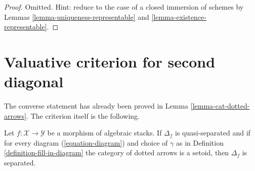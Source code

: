 \begin{proof}
Omitted. Hint: reduce to the case of a closed immersion of
schemes by Lemmas \ref{lemma-uniqueness-representable} and
\ref{lemma-existence-representable}.
\end{proof}





\section{Valuative criterion for second diagonal}
\label{section-valuative-second}

\noindent
The converse statement has already been proved in
Lemma \ref{lemma-cat-dotted-arrows}.
The criterion itself is the following.

\begin{lemma}
\label{lemma-setoids-and-diagonal}
Let $f : \mathcal{X} \to \mathcal{Y}$ be a morphism of algebraic stacks.
If $\Delta_f$ is quasi-separated and if for every diagram
(\ref{equation-diagram}) and choice of $\gamma$ as in
Definition \ref{definition-fill-in-diagram}
the category of dotted arrows
is a setoid, then $\Delta_f$ is separated.
\end{lemma}

